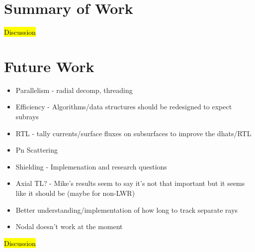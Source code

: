 \section{Summary of Work}

\hl{Discussion}

\section{Future Work}

\begin{itemize}
    \item Parallelism - radial decomp, threading
    \item Efficiency - Algorithms/data structures should be redesigned to expect subrays
    \item RTL - tally currents/surface fluxes on subsurfaces to improve the dhats/RTL
    \item Pn Scattering
    \item Shielding - Implemenation and research questions
    \item Axial TL? - Mike's results seem to say it's not that important but it seems like it should be (maybe for non-LWR)
    \item Better understanding/implementation of how long to track separate rays
    \item Nodal doesn't work at the moment
\end{itemize}

\hl{Discussion}